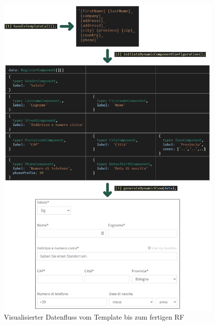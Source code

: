 \begin{figure}[H]
	\centerline{
		\includegraphics[width=1\textwidth, frame]{./grafiken/RF_Datenvisualisierung.png}
	}
	\vskip0pt
	\caption{Visualisierter Datenfluss vom Template bis zum fertigen RF}
\end{figure}

